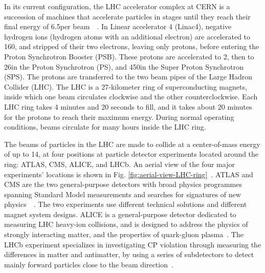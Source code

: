 In its current configuration, the LHC accelerator complex at CERN is a succession of machines that accelerate particles in stages until they reach their final energy of 6.5\TeV per beam~\cite{CERN-OPEN-2000-148}~\cite{Linac4-design-report-2020}. In Linear accelerator 4 (Linac4), negative hydrogen ions (hydrogen atoms with an additional electron) are accelerated to 160\MeV, and stripped of their two electrons, leaving only protons, before entering the Proton Synchrotron Booster (PSB). These protons are accelerated to 2\GeV, then to 26\GeV in the Proton Synchrotron (PS), and 450\GeV in the Super Proton Synchrotron (SPS). The protons are transferred to the two beam pipes of the Large Hadron Collider (LHC). The LHC is a 27-kilometer ring of superconducting magnets, inside which one beam circulates clockwise and the other counterclockwise. Each LHC ring takes 4 minutes and 20 seconds to fill, and it takes about 20 minutes for the protons to reach their maximum energy. During normal operating conditions, beams circulate for many hours inside the LHC ring. 

The beams of particles in the LHC are made to collide at a center-of-mass energy of up to 14\TeV, at four positions at particle detector experiments located around the ring: ATLAS, CMS, ALICE, and LHCb. An aerial view of the four major experiments' locations is shown in Fig. \ref{fig:aerial-view-LHC-ring}~\cite{OPEN-PHO-ACCEL-2017-005}. ATLAS and CMS are the two general-purpose detectors with broad physics programmes spanning Standard Model measurements and searches for signatures of new physics~\cite{ATLAS-TDR-14}~\cite{CERN-LHCC-2006-001}. The two experiments use different technical solutions and different magnet system designs. ALICE is a general-purpose detector dedicated to measuring LHC heavy-ion collisions, and is designed to address the physics of strongly interacting matter, and the properties of quark-gluon plasma~\cite{ALICE-original-TDR}. The LHCb experiment specializes in investigating CP violation through measuring the differences in matter and antimatter, by using a series of subdetectors to detect mainly forward particles close to the beam direction~\cite{LHCb-1998}. 


